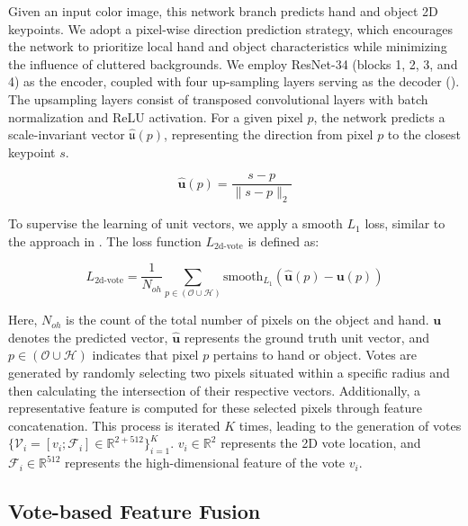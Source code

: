 Given an input color image, this network branch predicts hand and object 2D keypoints. We adopt a pixel-wise direction prediction strategy, which encourages the network to prioritize local hand and object characteristics while minimizing the influence of cluttered backgrounds. We employ ResNet-34 (blocks 1, 2, 3, and 4) as the encoder, coupled with four up-sampling layers serving as the decoder (\cite{he2016deep}). The upsampling layers consist of transposed convolutional layers with batch normalization and ReLU activation. For a given pixel $p$, the network predicts a scale-invariant vector $\hat{\mathfrak{u}}(p)$, representing the direction from pixel $p$ to the closest keypoint $s$.

\begin{equation} 
\hat{\mathbf{u}}(p) = \frac{s - p}{\parallel s - p \parallel_2}
\end{equation}

\noindent To supervise the learning of unit vectors, we apply a smooth $L_1$ loss, similar to the approach in \cite{girshick2015fast}. The loss function $L_{\text{2d-vote}}$ is defined as:

\begin{equation} 
L_{\text{2d-vote}} = \dfrac{1}{N_{oh}} \sum_{p \in (\mathcal{O} \cup \mathcal{H})} \text{smooth}_{L_1} ( \hat{\mathbf{u}}(p) - \mathbf{u}(p) )
\end{equation}

\noindent Here, $N_{oh}$ is the count of the total number of pixels on the object and hand. $\mathbf{u}$ denotes the predicted vector, $\hat{\mathbf{u}}$ represents the ground truth unit vector, and $p \in (\mathcal{O} \cup \mathcal{H})$ indicates that pixel $p$ pertains to hand or object. Votes are generated by randomly selecting two pixels situated within a specific radius and then calculating the intersection of their respective vectors. Additionally, a representative feature is computed for these selected pixels through feature concatenation. This process is iterated $K$ times, leading to the generation of votes $\{ \mathcal{V}_{i} = [v_i; \mathcal{F}_i] \in \mathbb{R}^{2+512} \}_{i=1}^{K}$. $v_i \in \mathbb{R}^2$ represents the 2D vote location, and $\mathcal{F}_i \in \mathbb{R}^{512}$ represents the high-dimensional feature of the vote $v_i$.

\subsection{Vote-based Feature Fusion}

